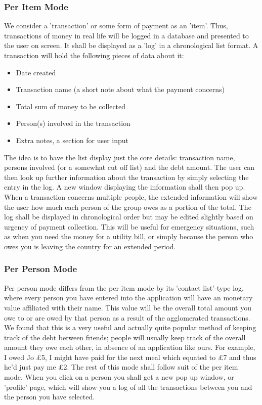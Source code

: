 \documentclass[a4paper,11pt]{article}
\begin{document}
\subsubsection*{Per Item Mode}
We consider a 'transaction' or some form of payment as an 'item'. Thus, transactions of money in real life will be logged in a database and presented to the user on screen. It shall be displayed as a 'log' in a chronological list format. 
A transaction will hold the following pieces of data about it:
\begin{itemize}
\item{Date created}
\item{Transaction name (a short note about what the payment concerns)}
\item{Total sum of money to be collected}
\item{Person(s) involved in the transaction}
\item{Extra notes, a section for user input}
\end{itemize}
The idea is to have the list display just the core details: transaction name, persons involved (or a somewhat cut off list) and the debt amount. The user can then look up further information about the transaction by simply selecting the entry in the log. A new window displaying the information shall then pop up. When a transaction concerns multiple people, the extended information will show the user how much each person of the group owes as a portion of the total.
The log shall be displayed in chronological order but may be edited slightly based on urgency of payment collection. This will be useful for emergency situations, such as when you need the money for a utility bill, or simply because the person who owes you is leaving the country for an extended period.

\subsubsection*{Per Person Mode}
Per person mode differs from the per item mode by its 'contact list'-type log, where every person you have entered into the application will have an monetary value affiliated with their name. This value will be the overall total amount you owe to or are owed by that person as a result of the agglomerated transactions. 
We found that this is a very useful and actually quite popular method of keeping track of the debt between friends; people will usually keep track of the overall amount they owe each other, in absence of an application like ours. For example, I owed Jo \pounds5, I might have paid for the next meal which equated to \pounds7 and thus he'd just pay me \pounds2. 
The rest of this mode shall follow suit of the per item mode. When you click on a person you shall get a new pop up window, or 'profile' page, which will show you a log of all the transactions between you and the person you have selected.
\end{document}
